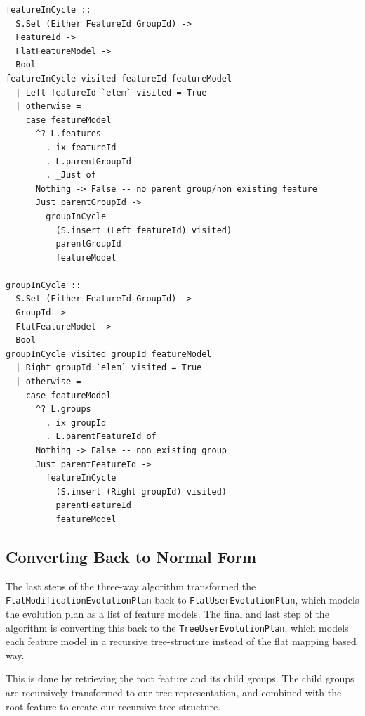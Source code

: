 \documentclass[a4paper,english]{ifimaster}
\begin{document}
\begin{verbatim}
featureInCycle ::
  S.Set (Either FeatureId GroupId) ->
  FeatureId ->
  FlatFeatureModel ->
  Bool
featureInCycle visited featureId featureModel
  | Left featureId `elem` visited = True
  | otherwise =
    case featureModel
      ^? L.features
        . ix featureId
        . L.parentGroupId
        . _Just of
      Nothing -> False -- no parent group/non existing feature
      Just parentGroupId ->
        groupInCycle
          (S.insert (Left featureId) visited)
          parentGroupId
          featureModel

groupInCycle ::
  S.Set (Either FeatureId GroupId) ->
  GroupId ->
  FlatFeatureModel ->
  Bool
groupInCycle visited groupId featureModel
  | Right groupId `elem` visited = True
  | otherwise =
    case featureModel
      ^? L.groups
        . ix groupId
        . L.parentFeatureId of
      Nothing -> False -- non existing group
      Just parentFeatureId ->
        featureInCycle
          (S.insert (Right groupId) visited)
          parentFeatureId
          featureModel
\end{verbatim}

\subsection{Converting Back to Normal Form}%
\label{sub:converting_back_to_normal_form}

The last steps of the three-way algorithm transformed the \texttt{FlatModificationEvolutionPlan} back to \texttt{FlatUserEvolutionPlan}, which models the evolution plan as a list of feature models. The final and last step of the algorithm is converting this back to the \texttt{TreeUserEvolutionPlan}, which models each feature model in a recursive tree-structure instead of the flat mapping based way.

This is done by retrieving the root feature and its child groups. The child groups are recursively transformed to our tree representation, and combined with the root feature to create our recursive tree structure.
\end{document}
